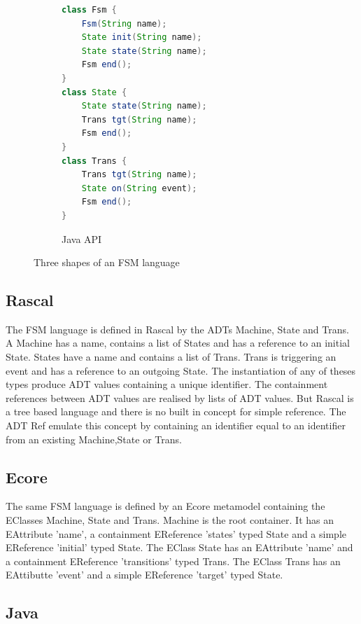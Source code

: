\begin{figure}[bt]
	\enskip
	\vrule
	\enskip
	\begin{subfigure}[b]{.35\columnwidth}
		\begin{lstlisting}[label=lst:fsm-api, language=Java, numbers=none, xleftmargin=0pt, tabsize=1]
class Fsm {
	Fsm(String name);
	State init(String name);
	State state(String name);
	Fsm end();
}
class State {
	State state(String name);
	Trans tgt(String name);
	Fsm end();
}
class Trans {
	Trans tgt(String name);
	State on(String event);
	Fsm end();
}
		\end{lstlisting}
		\caption{Java API}
	\end{subfigure}
	\caption{Three shapes of an FSM language}
\end{figure}

\subsection{Rascal}

The FSM language is defined in Rascal by the ADTs Machine, State and Trans.
A Machine has a name, contains a list of States and has a reference to an initial State.
States have a name and contains a list of Trans.
Trans is triggering an event and has a reference to an outgoing State.
The instantiation of any of theses types produce ADT values containing a unique identifier.
The containment references between ADT values are realised by lists of ADT values. But Rascal is a tree based language and there is no built in concept for simple reference.
The ADT Ref emulate this concept by containing an identifier equal to an identifier from an existing Machine,State or Trans.

\subsection{Ecore}

The same FSM language is defined by an Ecore metamodel containing the EClasses Machine, State and Trans.
Machine is the root container. It has an EAttribute ’name’, a containment EReference ’states’ typed State and a simple EReference ’initial’ typed State.
The EClass State has an EAttribute ’name’ and a containment EReference ’transitions’ typed Trans.
The EClass Trans has an EAttibutte ’event’ and a simple EReference ’target’ typed State.

\subsection{Java}


